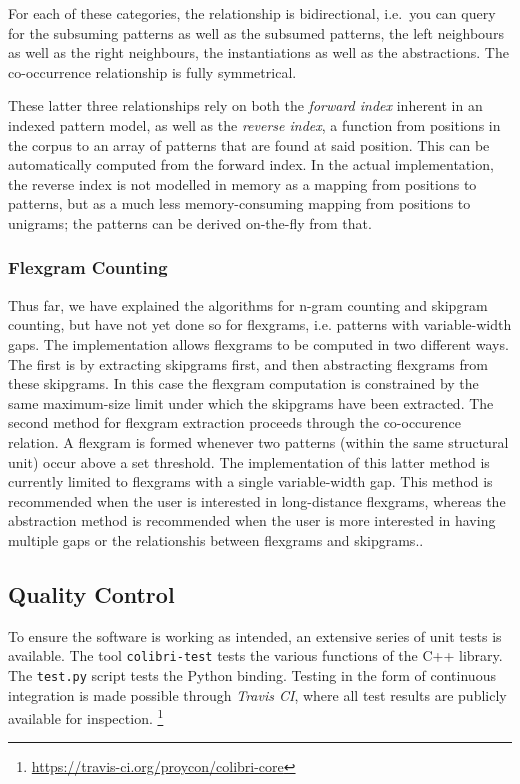 \documentclass[a4paper,12pt]{article}
\begin{document}
For each of these categories, the relationship is bidirectional, i.e.\ you can
query for the subsuming patterns as well as the subsumed patterns, the left
neighbours as well as the right neighbours, the instantiations as well as the
abstractions. The co-occurrence relationship is fully symmetrical. 

These latter three relationships rely on both the \emph{forward index} inherent
in an indexed pattern model, as well as the \emph{reverse index}, a function
from positions in the corpus to an array of patterns that are found at said
position. This can be automatically computed from the forward index. In the
actual implementation, the reverse index is not modelled in memory as a mapping from
positions to patterns, but as a much less memory-consuming mapping from
positions to unigrams; the patterns can be derived on-the-fly from that.

\subsubsection{Flexgram Counting}

Thus far, we have explained the algorithms for n-gram counting and skipgram
counting, but have not yet done so for flexgrams, i.e. patterns with
variable-width gaps. The implementation allows flexgrams to be computed in two
different ways. The first is by extracting skipgrams first, and then
abstracting flexgrams from these skipgrams. In this case the flexgram
computation is constrained by the same maximum-size limit under which the
skipgrams have been extracted.  The second method for flexgram extraction
proceeds through the co-occurence relation. A flexgram is formed whenever two
patterns (within the same structural unit) occur above a set threshold. The
implementation of this latter method is currently limited to flexgrams with a
single variable-width gap. This method is recommended when the user is
interested in long-distance flexgrams, whereas the abstraction method is
recommended when the user is more interested in having multiple gaps or
the relationshis between flexgrams and skipgrams..

\subsection{Quality Control}
\label{sec:qc}

To ensure the software is working as intended, an extensive series of unit
tests is available.  The tool \texttt{colibri-test} tests the various functions
of the C++ library. The \texttt{test.py} script tests the Python binding.
Testing in the form of continuous integration is made possible through
\emph{Travis CI}, where all test results are publicly available for inspection.
\footnote{\url{https://travis-ci.org/proycon/colibri-core}}
\end{document}
